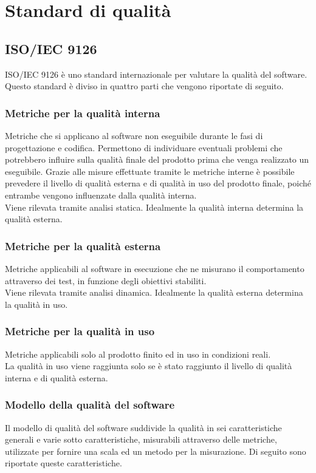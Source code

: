 \section{Standard di qualità}

	\subsection{ISO/IEC 9126}
	ISO/IEC 9126 è uno standard internazionale per valutare la qualità del software.\\%
	Questo standard è diviso in quattro parti che vengono riportate di seguito.
		\subsubsection{Metriche per la qualità interna}
		Metriche che si applicano al software non eseguibile durante le fasi di progettazione e codifica. Permettono di individuare eventuali problemi che potrebbero influire sulla qualità finale del prodotto prima che venga realizzato un eseguibile. Grazie alle misure effettuate tramite le metriche interne è possibile prevedere il livello di qualità esterna e di qualità in uso del prodotto finale, poiché entrambe vengono influenzate dalla qualità interna.\\
		Viene rilevata tramite analisi statica. Idealmente la qualità interna determina la qualità esterna.
		\subsubsection{Metriche per la qualità esterna}
		Metriche applicabili al software in esecuzione che ne misurano il comportamento attraverso dei test, in funzione degli obiettivi stabiliti.\\
		Viene rilevata tramite analisi dinamica. Idealmente la qualità esterna determina la qualità in uso.
		\subsubsection{Metriche per la qualità in uso}
		Metriche applicabili solo al prodotto finito ed in uso in condizioni reali.\\
		La qualità in uso viene raggiunta solo se è stato raggiunto il livello di qualità interna e di qualità esterna.
		\subsubsection{Modello della qualità del software}
		Il modello di qualità del software suddivide la qualità in sei caratteristiche generali e varie sotto caratteristiche, misurabili attraverso delle metriche, utilizzate per fornire una scala ed un metodo per la misurazione. Di seguito sono riportate queste caratteristiche.

